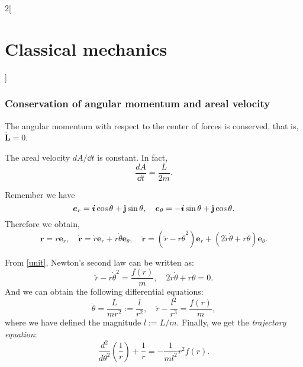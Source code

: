 \documentclass[../../../main.tex]{subfiles}
\begin{document}
\begin{multicols}{2}[\section{Classical mechanics}]
    \subsubsection*{Conservation of angular momentum and areal velocity}
    \begin{prop}
        The angular momentum with respect to the center of forces is conserved, that is, $\dot{\boldsymbol{L}}=0$.
    \end{prop}
    \begin{prop}
        The areal velocity $dA/\dd t$ is constant. In fact, $$\frac{dA}{\dd t}=\frac{L}{2m}.$$
    \end{prop}
    \begin{prop}
        Remember we have $$\boldsymbol{e}_r=\boldsymbol{i}\cos\theta+\vb{j}\sin\theta,\quad\boldsymbol{e}_\theta=-\boldsymbol{i}\sin\theta+\vb{j}\cos\theta.$$ Therefore we obtain,
        \begin{equation}
            \boldsymbol{r}=r\boldsymbol{e}_r,\quad\boldsymbol{\dot{r}}=\dot{r}\boldsymbol{e}_r+r\dot{\theta}\boldsymbol{e}_\theta,\quad\boldsymbol{\ddot{r}}=(\ddot{r}-r\dot{\theta}^2)\boldsymbol{e}_r+(2\dot{r}\dot{\theta}+r\ddot{\theta})\boldsymbol{e}_\theta.
            \label{unit}
        \end{equation}
    \end{prop}
    \begin{prop}
        From \eqref{unit}, Newton's second law can be written as: $$\ddot{r}-r\dot{\theta}^2=\frac{f(r)}{m},\quad 2\dot{r}\dot{\theta}+r\ddot{\theta}=0.$$ And we can obtain the following differential equations: $$\dot{\theta}=\frac{L}{m r^2}:=\frac{l}{r^2},\quad\ddot{r}-\frac{l^2}{r^3}=\frac{f(r)}{m},$$ where we have defined the magnitude $l:=L/m$. Finally, we get the \textit{trajectory equation}: $$\frac{d^2}{d\theta^2}\left(\frac{1}{r}\right)+\frac{1}{r}=-\frac{1}{ml^2}r^2f(r).$$
    \end{prop}

\end{multicols}
\end{document}
